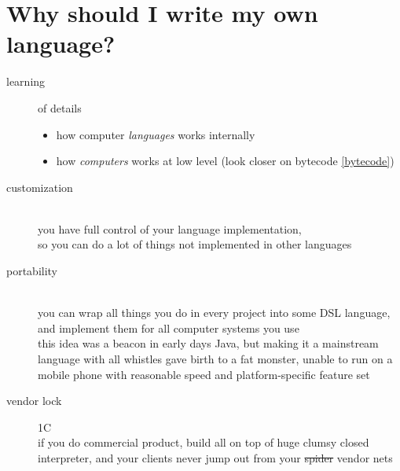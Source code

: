\section{Why should I write my own language?}\label{whylanguage}

\begin{description}
\item[learning] of details
\begin{itemize}
  \item 
how computer \emph{languages} works internally
\item
how \emph{computers} works at low level (look closer on bytecode \ref{bytecode}) 
\end{itemize} 
\item[customization]\ \\
you have full control of your language implementation,\\
so you can do a lot of things not implemented in other languages
\item[portability]\ \\
you can wrap all things you do in every project into some DSL language, and
implement them for all computer systems you use\\
this idea was a beacon in early days Java, but making it a mainstream language
with all whistles gave birth to a fat monster, unable to run on a mobile phone
with reasonable speed and platform-specific feature set
\item[vendor lock] {\tiny 1C}\\
if you do commercial product, build all on top of huge clumsy closed
interpreter, and your clients never jump out from your \st{spider} vendor nets
\end{description}
